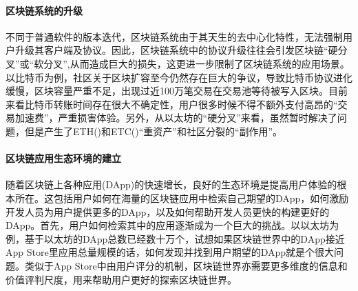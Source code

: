 \paragraph{区块链系统的升级}不同于普通软件的版本迭代，区块链系统由于其天生的去中心化特性，无法强制用户升级其客户端及协议。因此，区块链系统中的协议升级往往会引发区块链“硬分叉”或“软分叉”,从而造成巨大的损失，这更进一步限制了区块链系统的应用场景。以比特币为例，社区关于区块扩容至今仍然存在巨大的争议，导致比特币协议进化缓慢，区块容量严重不足，出现过近100万笔交易在交易池等待被写入区块。目前来看比特币转账时间存在很大不确定性，用户很多时候不得不额外支付高昂的“交易加速费”，严重损害体验。另外，从以太坊的“硬分叉”来看，虽然暂时解决了问题，但是产生了ETH()和ETC()“重资产”和社区分裂的“副作用”。

\paragraph{区块链应用生态环境的建立}随着区块链上各种应用(DApp)的快速增长，良好的生态环境是提高用户体验的根本所在。这包括用户如何在海量的区块链应用中检索自己期望的DApp，如何激励开发人员为用户提供更多的DApp，以及如何帮助开发人员更快的构建更好的DApp。首先，用户如何检索其中的应用逐渐成为一个巨大的挑战。以以太坊为例，基于以太坊的DApp总数已经数十万个，试想如果区块链世界中的DApp接近App
Store里应用总量规模的话，如何发现并找到用户期望的DApp就是个很大问题。类似于App
Store中由用户评分的机制，区块链世界亦需要更多维度的信息和价值评判尺度，用来帮助用户更好的探索区块链世界。

